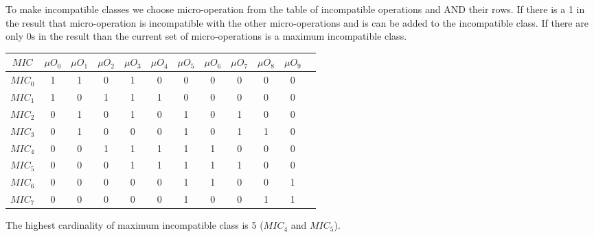 To make incompatible classes we choose micro-operation from the table of incompatible operations and AND their rows.
If there is a 1 in the result that micro-operation is incompatible with the other micro-operations and is can be
added to the incompatible class. If there are only 0s in the result than the current set of micro-operations is a maximum incompatible class.
\begin{table}[H]
    \centering
    \begin{tabular}{|c|c|c|c|c|c|c|c|c|c|c|c|}
        \hline
        $MIC$ & $\mu O_{0}$ & $\mu O_{1}$ & $\mu O_{2}$ & $\mu O_{3}$ & $\mu O_{4}$ & $\mu O_{5}$ & $\mu O_{6}$ & $\mu O_{7}$ & $\mu O_{8}$ & $\mu O_{9}$ \\ \hline
        $MIC_{0}$ & 1 & 1 & 0 & 1 & 0 & 0 & 0 & 0 & 0 & 0 \\ \hline
        $MIC_{1}$ & 1 & 0 & 1 & 1 & 1 & 0 & 0 & 0 & 0 & 0 \\ \hline
        $MIC_{2}$ & 0 & 1 & 0 & 1 & 0 & 1 & 0 & 1 & 0 & 0 \\ \hline
        $MIC_{3}$ & 0 & 1 & 0 & 0 & 0 & 1 & 0 & 1 & 1 & 0 \\ \hline
        $MIC_{4}$ & 0 & 0 & 1 & 1 & 1 & 1 & 1 & 0 & 0 & 0 \\ \hline
        $MIC_{5}$ & 0 & 0 & 0 & 1 & 1 & 1 & 1 & 1 & 0 & 0 \\ \hline
        $MIC_{6}$ & 0 & 0 & 0 & 0 & 0 & 1 & 1 & 0 & 0 & 1 \\ \hline
        $MIC_{7}$ & 0 & 0 & 0 & 0 & 0 & 1 & 0 & 0 & 1 & 1 \\ \hline
    \end{tabular}
\end{table}

The highest cardinality of maximum incompatible class is 5 ($MIC_{4}$ and $MIC_{5}$).